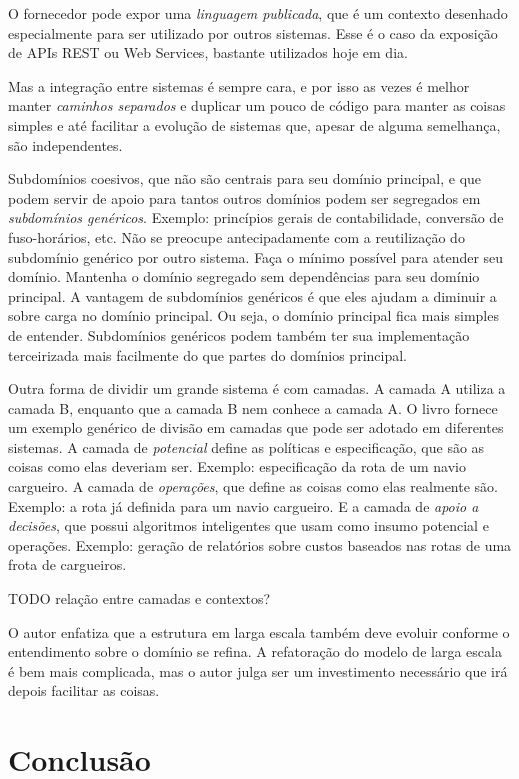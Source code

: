 \documentclass[a4paper, 12pt]{article}
\begin{document}
O fornecedor pode expor uma \emph{linguagem publicada}, que é um contexto desenhado especialmente para ser utilizado por outros sistemas. Esse é o caso da exposição de APIs REST ou Web Services, bastante utilizados hoje em dia.

Mas a integração entre sistemas é sempre cara, e por isso as vezes é melhor manter \emph{caminhos separados} e duplicar um pouco de código para manter as coisas simples e até facilitar a evolução de sistemas que, apesar de alguma semelhança, são independentes.

Subdomínios coesivos, que não são centrais para seu domínio principal, e que podem servir de apoio para tantos outros domínios podem ser segregados em \emph{subdomínios genéricos}. Exemplo: princípios gerais de contabilidade, conversão de fuso-horários, etc. Não se preocupe antecipadamente com a reutilização do subdomínio genérico por outro sistema. Faça o mínimo possível para atender seu domínio. Mantenha o domínio segregado sem dependências para seu domínio principal. A vantagem de subdomínios genéricos é que eles ajudam a diminuir a sobre carga no domínio principal. Ou seja, o domínio principal fica mais simples de entender. Subdomínios genéricos podem também ter sua implementação terceirizada mais facilmente do que partes do domínios principal.

Outra forma de dividir um grande sistema é com camadas. A camada A utiliza a camada B, enquanto que a camada B nem conhece a camada A. O livro fornece um exemplo genérico de divisão em camadas que pode ser adotado em diferentes sistemas. A camada de \emph{potencial} define as políticas e especificação, que são as coisas como elas deveriam ser. Exemplo: especificação da rota de um navio cargueiro. A camada de \emph{operações}, que define as coisas como elas realmente são. Exemplo: a rota já definida para um navio cargueiro. E a camada de \emph{apoio a decisões}, que possui algoritmos inteligentes que usam como insumo potencial e operações. Exemplo: geração de relatórios sobre custos baseados nas rotas de uma frota de cargueiros.

TODO relação entre camadas e contextos?

O autor enfatiza que a estrutura em larga escala também deve evoluir conforme o entendimento sobre o domínio se refina. A refatoração do modelo de larga escala é bem mais complicada, mas o autor julga ser um investimento necessário que irá depois facilitar as coisas.

\section{Conclusão}
\end{document}
